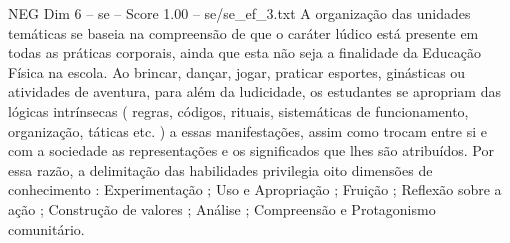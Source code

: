 \begin{textsample}{NEG Dim 6 – se – Score 1.00 – se/se\_ef\_3.txt}
A organização das unidades temáticas se baseia na compreensão de que o caráter lúdico está presente em todas as práticas corporais, ainda que esta não seja a finalidade da Educação Física na escola.
Ao brincar, dançar, jogar, praticar esportes, ginásticas ou atividades de aventura, para além da ludicidade, os estudantes se apropriam das lógicas intrínsecas ( regras, códigos, rituais, sistemáticas de funcionamento, organização, táticas etc. ) a essas manifestações, assim como trocam entre si e com a sociedade as representações e os significados que lhes são atribuídos.
Por essa razão, a delimitação das habilidades privilegia oito dimensões de conhecimento : Experimentação ; Uso e Apropriação ; Fruição ; Reflexão sobre a ação ; Construção de valores ; Análise ; Compreensão e Protagonismo comunitário.

\end{textsample}
